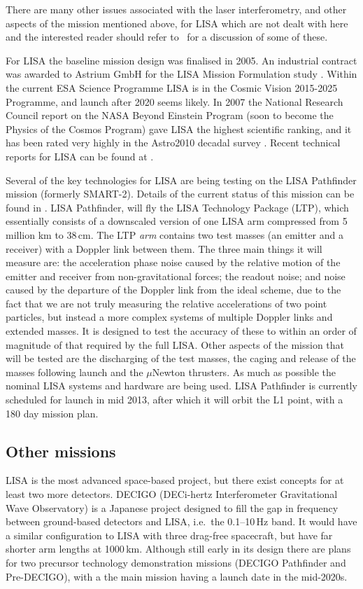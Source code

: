 \documentclass{article}
\begin{document}
There are many other issues associated with the laser interferometry, and other
aspects of the mission mentioned above, for LISA which are not dealt with here
and the interested reader should refer to~\cite{Houghetal, Jennrich:2009,
Johann:2008} for a discussion of some of these.

For LISA the baseline mission design was finalised in 2005. An industrial
contract was awarded to Astrium GmbH for the LISA Mission Formulation study
\cite{Johann:2008}. Within the current ESA Science Programme LISA is in the
Cosmic Vision 2015-2025 Programme, and launch after 2020 seems likely. 
In 2007 the National Research Council report on the NASA Beyond Einstein Program
(soon to become the Physics of the Cosmos Program) gave LISA the highest
scientific ranking, and it has been rated very highly in the Astro2010 decadal
survey \cite{astro2010}. Recent technical reports for LISA can be found at
\cite{LISATechReports}.

Several of the key technologies for LISA are being testing on the LISA
Pathfinder mission (formerly SMART-2). Details of the current status of this
mission can be found in \cite{Armano:2009}. LISA Pathfinder, will fly the LISA
Technology Package (LTP), which essentially consists of a downscaled version of
one LISA arm compressed from 5 million km to 38\,cm. The LTP {\it arm} contains
two test masses (an emitter and a receiver) with a Doppler link between them.
The three main things it will measure are: the acceleration phase noise caused
by the relative motion of the emitter and receiver from non-gravitational
forces; the readout noise; and noise caused by the departure of the Doppler link
from the ideal scheme, due to the fact that we are not truly measuring the
relative accelerations of two point particles, but instead a more complex
systems of multiple Doppler links and extended masses. It is designed to test
the accuracy of these to within an order  of magnitude of that required by
the full LISA. Other aspects of the mission that will be tested are the
discharging of the test masses, the caging and release of the masses following
launch and the $\mu$Newton thrusters. As much as possible the nominal LISA
systems and hardware are being used. LISA Pathfinder is currently scheduled for
launch in mid 2013, after which it will orbit the L1 point, with a 180 day
mission plan.

\subsection{Other missions}
LISA is the most advanced space-based project, but there exist concepts for at
least two more detectors. DECIGO (DECi-hertz Interferometer Gravitational Wave
Observatory) \cite{Sato:2009} is a Japanese project designed to fill the gap in
frequency between ground-based detectors and LISA, i.e.\ the 0.1--10\,Hz band. It
would have a similar configuration to LISA with three drag-free spacecraft, but
have far shorter arm lengths at 1000\,km. Although still early in its design
there are plans for two precursor technology demonstration missions (DECIGO
Pathfinder \cite{Ando:2009} and Pre-DECIGO), with a the main mission having a
launch date in the mid-2020s.
\end{document}
